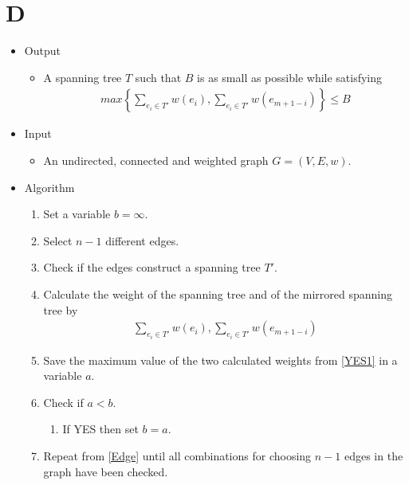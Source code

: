 \section{D}
\begin{itemize}
    \item Output
    \begin{itemize}
        \item A spanning tree $T$ such that $B$ is as small as possible while satisfying
        \begin{align*}
            max \left\{ \sum_{e_i \in T'} w(e_i), \sum_{e_i \in T'} w(e_{m+1-i}) \right\} \leq B
        \end{align*}
    \end{itemize}
    \item Input
    \begin{itemize}
        \item An undirected, connected and weighted graph $G=(V,E,w)$.
    \end{itemize}
    \item Algorithm
    \begin{enumerate}[label=\textbf{\arabic*.}]
        \item Set a variable $b = \infty$.
        \item \label{Edge} Select $n-1$ different edges.
        \item Check if the edges construct a spanning tree $T'$.
        \item \label{YES1} Calculate the weight of the spanning tree and of the mirrored spanning tree by
        \begin{align*}
            \sum_{e_i \in T'} w(e_i), \sum_{e_i \in T'} w(e_{m+1-i})
        \end{align*}
        \item Save the maximum value of the two calculated weights from \ref{YES1} in a variable $a$.
        \item Check if $a < b$.
        \begin{enumerate}
            \item If YES then set $b = a$.
        \end{enumerate}
        \item Repeat from \ref{Edge} until all combinations for choosing $n-1$ edges in the graph have been checked.
    \end{enumerate}
\end{itemize}